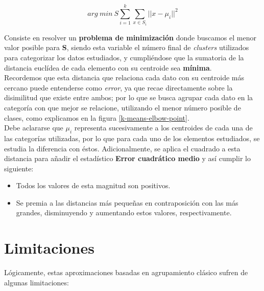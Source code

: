 \documentclass[]{report}
\begin{document}
				$$arg\:min\:S\sum_{i=1}^k\sum_{x\in{S_i}} \vert\vert{x-\mu_i}\vert\vert^2$$
				
				Consiste en resolver un \textbf{problema de minimización} donde buscamos el menor valor posible para \textbf{S}, siendo esta variable el número final de \textit{clusters} utilizados para categorizar los datos estudiados, y cumpliéndose que la sumatoria de la distancia euclídea de cada elemento con su centroide sea \textbf{mínima}.\\
				
				Recordemos que esta distancia que relaciona cada dato con su centroide más cercano puede entenderse como \textit{error}, ya que recae directamente sobre la disimilitud que existe entre ambos; por lo que se busca agrupar cada dato en la categoría con que mejor se relacione, utilizando el menor número posible de clases, como explicamos en la figura \ref{k-means-elbow-point}.\\
				
				Debe aclararse que $\mu_i$ representa sucesivamente a los centroides de cada una de las categorías utilizadas, por lo que para cada uno de los elementos estudiados, se estudia la diferencia con éstos. Adicionalmente, se aplica el cuadrado a esta distancia para añadir el estadístico \textbf{Error cuadrático medio} \cite{mean-squared-error} y así cumplir lo siguiente:
				
				\begin{itemize}
					\item Todos los valores de esta magnitud son positivos.
					\item Se premia a las distancias más pequeñas en contraposición con las más grandes, disminuyendo y aumentando estos valores, respectivamente.
				\end{itemize}
				
		\section{Limitaciones}
		
			Lógicamente, estas aproximaciones basadas en agrupamiento clásico sufren de algunas limitaciones:
			
\end{document}
